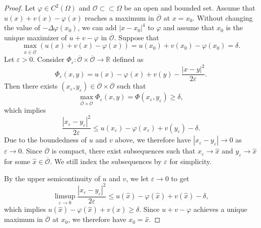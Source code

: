 \documentclass[12pt, reqno]{amsart}
\newcommand{\R}{\mathbb{R}}
\def\vep{\varepsilon}
\def\ol{\overline}
\def\R{{\mathbb R}}
\def\O{{\mathcal O}}
\begin{document}
\begin{proof}
Let $\varphi\in C^2(\Omega)$ and $\O\subset\subset \Omega$ be an open and bounded set. 
Assume that $u(x)+v(x)-\varphi(x)$ reaches a maximum in $\overline{\O}$ at $x=x_0$. Without changing the value of $-\Delta \varphi(x_0)$, we can add $|x-x_0|^4$ to $\varphi$ and assume that $x_0$ is the unique maximizer of $u+v-\varphi$ in $\ol{\O}$.   Suppose that
\[
\max_{x\in \overline{\O}}(u(x)+v(x)-\varphi(x))=u(x_0)+v(x_0)-\varphi(x_0)=\delta.
\]
Let $\varepsilon>0$. Consider $\Phi_\varepsilon:\overline{\O}\times\overline{\O}\to \R$ defined as
\[
\Phi_\varepsilon(x,y)=u(x)-\varphi(x)+v(y)-\frac{|x-y|^2}{2\varepsilon}.
\]
Then there exists $(x_\varepsilon, y_\varepsilon)\in \overline{\O}\times \overline{\O}$ such that
\[
\max_{\overline{\O}\times\overline{\O}}\Phi_\varepsilon(x,y)=\Phi(x_\varepsilon, y_\varepsilon)\ge \delta,
\]
which implies
\[
\frac{|x_\varepsilon-y_\varepsilon|^2}{2\varepsilon}\le u(x_\varepsilon)-\varphi(x_\varepsilon)+v(y_\varepsilon)-\delta.
\]
Due to the boundedness of $u$ and $v$ above, we therefore have $|x_\vep-y_\vep|\to 0$ as $\vep\to 0$. Since $\overline{\O}$ is compact, there exist subsequences such that $x_\varepsilon\to \hat{x}$ and $y_\varepsilon\to \hat{x}$ for some $\hat{x}\in \overline{\O}$. We still index the subsequences by $\vep$ for simplicity. 

By the upper semicontinuity of $u$ and $v$, we let $\vep\to 0$ to get
\[
\limsup_{\varepsilon\to 0}\frac{|x_\varepsilon-y_\varepsilon|^2}{2\varepsilon}\le u(\hat{x})-\varphi(\hat{x})+v(\hat{x})-\delta,
\]
which implies $u(\hat{x})-\varphi(\hat{x})+v(\hat{x})\geq \delta$. 
Since $u+v-\varphi$ achieves a unique maximum in $\ol{\O}$ at $x_0$, we therefore have $x_0=\hat{x}$. 



\end{proof}
\end{document}
